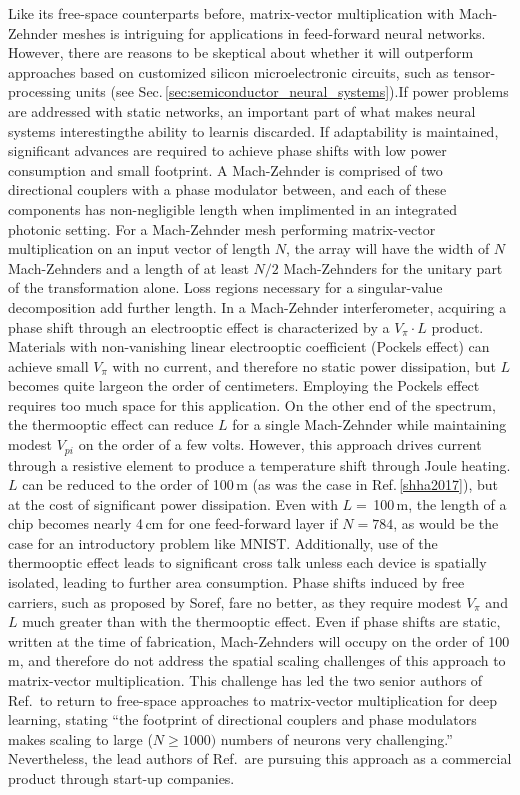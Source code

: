 Like its free-space counterparts before, matrix-vector multiplication with Mach-Zehnder meshes is intriguing for applications in feed-forward neural networks. However, there are reasons to be skeptical about whether it will outperform approaches based on customized silicon microelectronic circuits, such as tensor-processing units (see Sec.\,\ref{sec:semiconductor_neural_systems}).If power problems are addressed with static networks, an important part of what makes neural systems interesting\textemdash the ability to learn\textemdash is discarded. If adaptability is maintained, significant advances are required to achieve phase shifts with low power consumption and small footprint. A Mach-Zehnder is comprised of two directional couplers with a phase modulator between, and each of these components has non-negligible length when implimented in an integrated photonic setting. For a Mach-Zehnder mesh performing matrix-vector multiplication on an input vector of length $N$, the array will have the width of $N$ Mach-Zehnders and a length of at least $N/2$ Mach-Zehnders for the unitary part of the transformation alone. Loss regions necessary for a singular-value decomposition add further length. In a Mach-Zehnder interferometer, acquiring a phase shift through an electrooptic effect is characterized by a $V_{\pi}\cdot L$ product. Materials with non-vanishing linear electrooptic coefficient (Pockels effect) can achieve small $V_{\pi}$ with no current, and therefore no static power dissipation, but $L$ becomes quite large\textemdash on the order of centimeters. Employing the Pockels effect requires too much space for this application. On the other end of the spectrum, the thermooptic effect can reduce $L$ for a single Mach-Zehnder while maintaining modest $V_{pi}$ on the order of a few volts. However, this approach drives current through a resistive element to produce a temperature shift through Joule heating. $L$ can be reduced to the order of 100\,\textmu m (as was the case in Ref.\,\ref{shha2017}), but at the cost of significant power dissipation. Even with $L=$\,100\,\textmu m, the length of a chip becomes nearly 4\,cm for one feed-forward layer if $N = 784$, as would be the case for an introductory problem like MNIST. Additionally, use of the thermooptic effect leads to significant cross talk unless each device is spatially isolated, leading to further area consumption. Phase shifts induced by free carriers, such as proposed by Soref, fare no better, as they require modest $V_{\pi}$ and $L$ much greater than with the thermooptic effect. Even if phase shifts are static, written at the time of fabrication, Mach-Zehnders will occupy on the order of 100\,\textmu m, and therefore do not address the spatial scaling challenges of this approach to matrix-vector multiplication. This challenge has led the two senior authors of Ref.\,\cite{shha2017} to return to free-space approaches to matrix-vector multiplication for deep learning, stating ``the footprint of directional couplers and phase modulators makes scaling to large ($N\ge 1000)$ numbers of neurons very challenging.'' Nevertheless, the lead authors of Ref.\,\cite{shha2017} are pursuing this approach as a commercial product through start-up companies.

